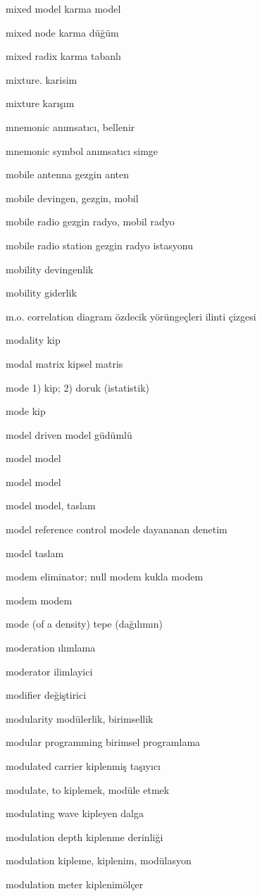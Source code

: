 \documentclass[12pt,fleqn]{article}\usepackage{../../common}
\begin{document}
mixed model karma model

mixed node karma düğüm

mixed radix karma tabanlı

mixture. karisim

mixture karışım

mnemonic anımsatıcı, bellenir

mnemonic symbol anımsatıcı simge

mobile antenna gezgin anten

mobile devingen, gezgin, mobil

mobile radio gezgin radyo, mobil radyo

mobile radio station gezgin radyo istasyonu

mobility devingenlik

mobility giderlik

m.o. correlation diagram özdecik yörüngeçleri ilinti çizgesi

modality kip

modal matrix kipsel matris

mode 1) kip; 2) doruk (istatistik)

mode kip

model driven model güdümlü

model model

model model

model model, taslam

model reference control modele dayananan denetim

model taslam

modem eliminator; null modem kukla modem

modem modem

mode (of a density) tepe (dağılımın)

moderation ılımlama

moderator ilimlayici

modifier değiştirici

modularity modülerlik, birimsellik

modular programming birimsel programlama

modulated carrier kiplenmiş taşıyıcı

modulate, to kiplemek, modüle etmek

modulating wave kipleyen dalga

modulation depth kiplenme derinliği

modulation kipleme, kiplenim, modülasyon

modulation meter kiplenimölçer
\end{document}
